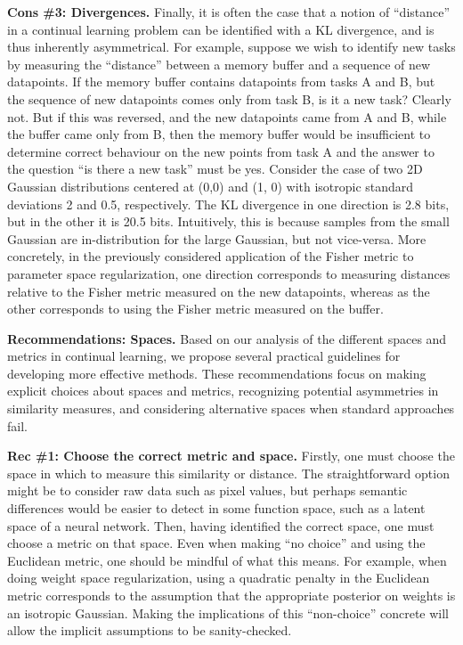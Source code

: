 \textbf{Cons \#3: Divergences.}
Finally, it is often the case that a notion of ``distance'' in a continual learning problem can be identified with a KL divergence, and is thus inherently asymmetrical.
For example, suppose we wish to identify new tasks by measuring the ``distance'' between a memory buffer and a sequence of new datapoints.
If the memory buffer contains datapoints from tasks A and B, but the sequence of new datapoints comes only from task B, is it a new task? Clearly not.
But if this was reversed, and the new datapoints came from A and B, while the buffer came only from B, then the memory buffer would be insufficient to determine correct behaviour on the new points from task A and the answer to the question ``is there a new task'' must be yes.
Consider the case of two 2D Gaussian distributions centered at (0,0) and (1, 0) with isotropic standard deviations 2 and 0.5, respectively.
The KL divergence in one direction is 2.8 bits, but in the other it is 20.5 bits.
Intuitively, this is because samples from the small Gaussian are in-distribution for the large Gaussian, but not vice-versa.
More concretely, in the previously considered application of the Fisher metric to parameter space regularization,
one direction corresponds to measuring distances relative to the Fisher metric measured on the new datapoints, whereas as the other corresponds to using the Fisher metric measured on the buffer.

\begin{tcolorbox}[colback=blue!10,colframe=blue!50,boxsep=-1pt]
\textbf{Recommendations: Spaces.}
Based on our analysis of the different spaces and metrics in continual learning, we propose 
several practical guidelines for developing more effective methods. These recommendations 
focus on making explicit choices about spaces and metrics, recognizing potential asymmetries 
in similarity measures, and considering alternative spaces when standard approaches fail.
\end{tcolorbox}

\textbf{Rec \#1: Choose the correct metric and space.}
Firstly, one must choose the space in which to measure this similarity or distance.
The straightforward option might be to consider raw data such as pixel values, but perhaps semantic differences would be easier to detect in some function space, such as a latent space of a neural network.
Then, having identified the correct space, one must choose a metric on that space.
Even when making ``no choice'' and using the Euclidean metric, one should be mindful of what this means.
For example, when doing weight space regularization, using a quadratic penalty in the Euclidean metric corresponds to the assumption that the appropriate posterior on weights is an isotropic Gaussian.
Making the implications of this ``non-choice'' concrete will allow the implicit assumptions to be sanity-checked.

